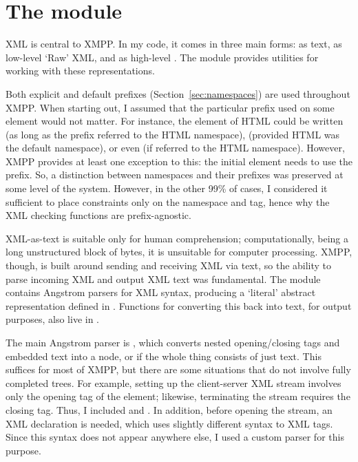 \documentclass[12pt,a4paper,twoside,openright]{report}
\begin{document}
{\section{The  module}\label{sec:xmlmod}
XML is central to XMPP. In my code, it comes in three main forms: as text, as low-level `Raw' XML, and as high-level . The  module provides utilities for working with these representations.

Both explicit and default prefixes (Section~\ref{sec:namespaces}) are used throughout XMPP. When starting out, I assumed that the particular prefix used on some element would not matter. For instance, the  element of HTML could be written  (as long as the  prefix referred to the HTML namespace),  (provided HTML was the default namespace), or even  (if  referred to the HTML namespace). However, XMPP provides at least one exception to this: the initial  element needs to use the  prefix. So, a distinction between namespaces and their prefixes was preserved at some level of the system. However, in the other 99\% of cases, I considered it sufficient to place constraints only on the namespace and tag, hence why the XML checking functions are prefix-agnostic.

XML-as-text is suitable only for human comprehension; computationally, being a long unstructured block of bytes, it is unsuitable for computer processing. XMPP, though, is built around sending and receiving XML via text, so the ability to parse incoming XML and output XML text was fundamental. The  module contains Angstrom parsers for XML syntax, producing a `literal' abstract representation defined in . Functions for converting this back into text, for output purposes, also live in .

The main Angstrom parser is , which converts nested opening/closing tags and embedded text into a  node, or  if the whole thing consists of just text. This suffices for most of XMPP, but there are some situations that do not involve fully completed trees. For example, setting up the client-server XML stream involves only the opening tag of the  element; likewise, terminating the stream requires the closing tag. Thus, I included  and . In addition, before opening the stream, an XML declaration  is needed, which uses slightly different syntax to XML tags. Since this syntax does not appear anywhere else, I used a custom parser for this purpose.

}
\end{document}
